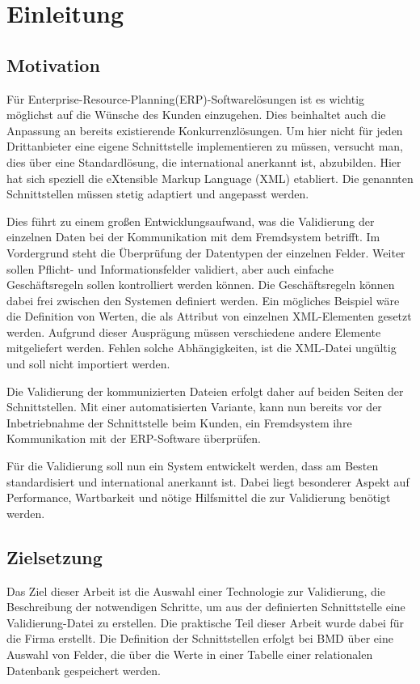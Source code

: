 \chapter{Einleitung}
\label{cha:Einleitung}

\section{Motivation}
Für Enterprise-Resource-Planning(ERP)-Softwarelösungen ist es wichtig möglichst auf die Wünsche des Kunden einzugehen. Dies beinhaltet auch die Anpassung an bereits existierende Konkurrenzlösungen. 
Um hier nicht für jeden Drittanbieter eine eigene Schnittstelle implementieren zu müssen, versucht man, dies über eine Standardlösung, die international anerkannt ist, abzubilden. Hier hat sich speziell die eXtensible Markup Language (XML) etabliert. Die genannten Schnittstellen müssen stetig adaptiert und angepasst werden. 

Dies führt zu einem großen Entwicklungsaufwand, was die Validierung der einzelnen Daten bei der Kommunikation mit dem Fremdsystem betrifft. 
Im Vordergrund steht die Überprüfung der Datentypen der einzelnen Felder. Weiter sollen Pflicht- und Informationsfelder validiert, aber auch einfache Geschäftsregeln sollen kontrolliert werden können. 
Die Geschäftsregeln können dabei frei zwischen den Systemen definiert werden. Ein mögliches Beispiel wäre die Definition von Werten, die als Attribut von einzelnen XML-Elementen gesetzt werden. Aufgrund dieser Ausprägung müssen verschiedene andere Elemente mitgeliefert werden. Fehlen solche Abhängigkeiten, ist die XML-Datei ungültig und soll nicht importiert werden.

Die Validierung der kommunizierten Dateien erfolgt daher auf beiden Seiten der Schnittstellen. Mit einer automatisierten Variante, kann nun bereits vor der Inbetriebnahme der Schnittstelle beim Kunden, ein Fremdsystem ihre Kommunikation mit der ERP-Software überprüfen. 

Für die Validierung soll nun ein System entwickelt werden, dass am Besten standardisiert und international anerkannt ist.
Dabei liegt besonderer Aspekt auf Performance, Wartbarkeit und nötige Hilfsmittel die zur Validierung benötigt werden.


\section{Zielsetzung}
Das Ziel dieser Arbeit ist die Auswahl einer Technologie zur Validierung, die Beschreibung der notwendigen Schritte, um aus der definierten Schnittstelle eine Validierung-Datei zu erstellen. Die praktische Teil dieser Arbeit wurde dabei für die Firma \BMD erstellt. Die Definition der Schnittstellen erfolgt bei BMD über eine Auswahl von Felder, die über die Werte in einer Tabelle einer relationalen Datenbank gespeichert werden. 

